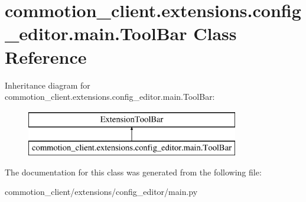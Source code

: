 \hypertarget{classcommotion__client_1_1extensions_1_1config__editor_1_1main_1_1ToolBar}{\section{commotion\+\_\+client.\+extensions.\+config\+\_\+editor.\+main.\+Tool\+Bar Class Reference}
\label{classcommotion__client_1_1extensions_1_1config__editor_1_1main_1_1ToolBar}
}
Inheritance diagram for commotion\+\_\+client.\+extensions.\+config\+\_\+editor.\+main.\+Tool\+Bar\+:\begin{figure}[H]
\begin{center}
\leavevmode
\includegraphics[height=2.000000cm]{classcommotion__client_1_1extensions_1_1config__editor_1_1main_1_1ToolBar}
\end{center}
\end{figure}


The documentation for this class was generated from the following file\+:\begin{DoxyCompactItemize}
\item 
commotion\+\_\+client/extensions/config\+\_\+editor/main.\+py\end{DoxyCompactItemize}
